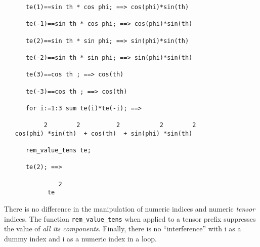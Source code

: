\begin{verbatim}
      te(1)==sin th * cos phi; ==> cos(phi)*sin(th)

      te(-1)==sin th * cos phi; ==> cos(phi)*sin(th)

      te(2)==sin th * sin phi; ==> sin(phi)*sin(th)

      te(-2)==sin th * sin phi; ==> sin(phi)*sin(th)

      te(3)==cos th ; ==> cos(th)

      te(-3)==cos th ; ==> cos(th)

      for i:=1:3 sum te(i)*te(-i); ==>

           2        2          2           2        2
   cos(phi) *sin(th)  + cos(th)  + sin(phi) *sin(th)

      rem_value_tens te;

      te(2); ==>

               2
            te
\end{verbatim}
There is no difference in the manipulation of numeric indices and numeric
\emph{tensor} indices. The function \texttt{rem\_value\_tens}
when applied to a tensor prefix suppresses the value of
\emph{all its components}. Finally, there is no ``interference'' with
i as a dummy index and i as a numeric index in a loop.

